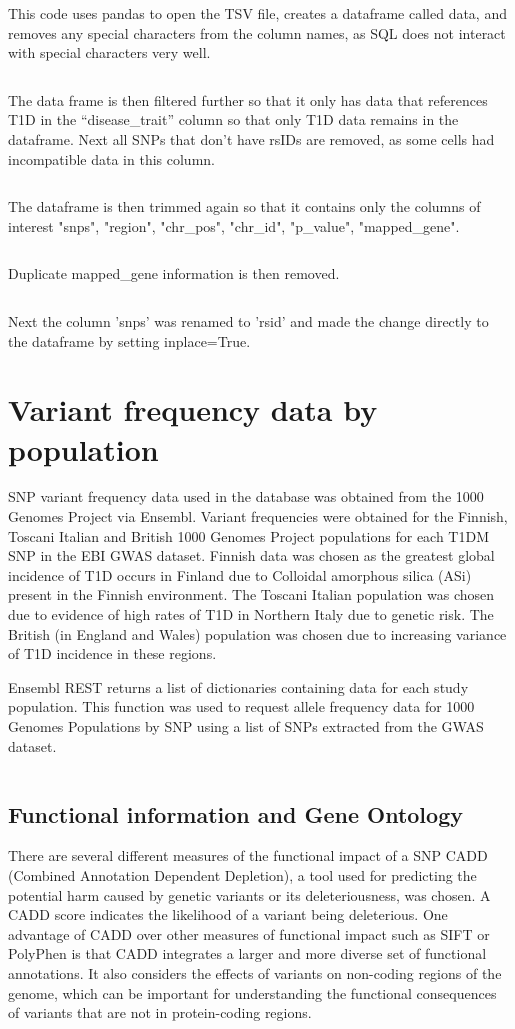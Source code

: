 \documentclass[12pt,a4paper]{article}
\newcommand{\mintfile}[1]{
\begin{tcolorbox}[colback=gray!5!white,%
	grow to left by=20mm,
    grow to right by=20mm,
    sharp corners]{{    \small \inputminted[breaklines]{python}{#1}		}}
\end{tcolorbox}}
\newcommand{\sect}[1]{
\clearpage
\hypertarget{#1}{
\section{#1}\label{#1}}
}
\newcommand{\subsect}[1]{
\FloatBarrier %
\hypertarget{#1}{
\subsection{#1}\label{#1}}
}
\begin{document}
\mintfile{code_snippets/placeholder.py}

This code uses pandas to open the TSV file, creates a dataframe called data, and removes any special characters from the column names,
as SQL does not interact with special characters very well.

\mintfile{code_snippets/placeholder.py}
The data frame is then filtered further so that it only has data that references T1D in the “disease\_trait” column so that only T1D data remains in the dataframe. Next all SNPs that don't have rsIDs are removed, as some cells had incompatible data in this column.

\mintfile{code_snippets/placeholder.py}
The dataframe is then trimmed again so that it contains only the columns of interest   "snps", "region", "chr\_pos", "chr\_id", "p\_value", "mapped\_gene".

\mintfile{code_snippets/placeholder.py}
Duplicate mapped\_gene information is then removed.

\mintfile{code_snippets/placeholder.py}
Next the column 'snps' was renamed to 'rsid' and made the change directly to the dataframe by setting inplace=True.


\sect{Variant frequency data by population}
SNP variant frequency data used in the database was obtained from the 1000 Genomes Project via Ensembl. Variant frequencies were obtained for the Finnish, Toscani Italian and British 1000 Genomes Project populations for each T1DM SNP in the EBI GWAS dataset. Finnish data was chosen as the greatest global incidence of T1D occurs in Finland due to  Colloidal amorphous silica (ASi) present in the Finnish environment. The Toscani Italian population was chosen due to evidence of high rates of T1D in Northern Italy due to genetic risk. The British (in England and Wales) population was chosen due to increasing variance of T1D incidence in these regions. 

Ensembl REST returns a list of dictionaries containing data for each study population. This function was used to request allele frequency data for 1000 Genomes Populations by SNP using a list of SNPs extracted from the GWAS dataset.

\mintfile{code_snippets/freq.py}

\subsect{Functional information and Gene Ontology}

There are several different measures of the functional impact of a SNP CADD (Combined Annotation Dependent Depletion), a tool used for predicting the potential harm caused by genetic variants or its deleteriousness, was chosen. A CADD score indicates the likelihood of a variant being deleterious.
One advantage of CADD over other measures of functional impact such as SIFT or PolyPhen is that CADD integrates a larger and more diverse set of functional annotations. It also considers the effects of variants on non-coding regions of the genome, which can be important for understanding the functional consequences of variants that are not in protein-coding regions.
\end{document}
